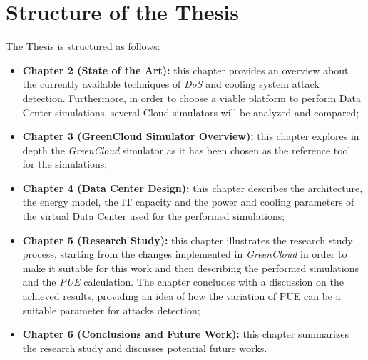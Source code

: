 \section{Structure of the Thesis}
The Thesis is structured as follows:
\begin{itemize}
    \item \textbf{Chapter 2 (State of the Art):} this chapter provides an overview about the currently available techniques of \emph{DoS} and cooling system attack detection. Furthermore, in order to choose a viable platform to perform Data Center simulations, several Cloud simulators will be analyzed and compared;
    \item \textbf{Chapter 3 (GreenCloud Simulator Overview):} this chapter explores in depth the \emph{GreenCloud} simulator as it has been chosen as the reference tool for the simulations;
    \item \textbf{Chapter 4 (Data Center Design):} this chapter describes the architecture, the energy model, the IT capacity and the power and cooling parameters of the virtual Data Center used for the performed simulations;
    \item \textbf{Chapter 5 (Research Study):} this chapter illustrates the research study process, starting from the changes implemented in \emph{GreenCloud} in order to make it suitable for this work and then describing the performed simulations and the \emph{PUE} calculation. The chapter concludes with a discussion on the achieved results, providing an idea of how the variation of PUE can be a suitable parameter for attacks detection;
    \item \textbf{Chapter 6 (Conclusions and Future Work):} this chapter summarizes the research study and discusses potential future works.
\end{itemize}